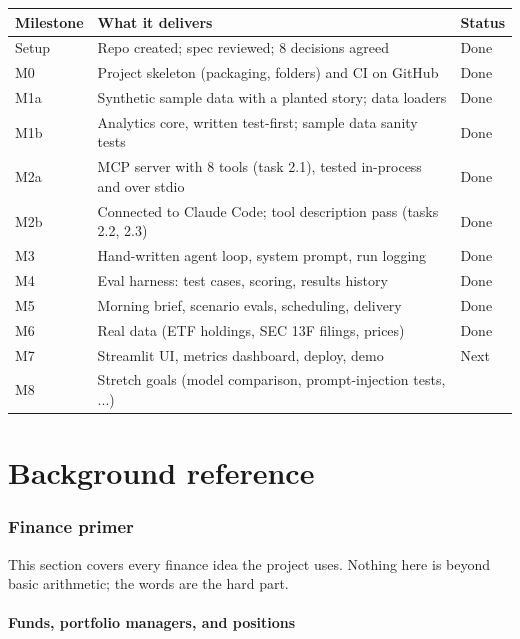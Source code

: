 \documentclass[11pt]{article}
\begin{document}
\begin{center}
\begin{tabularx}{\textwidth}{@{}l X l@{}}
\toprule
\textbf{Milestone} & \textbf{What it delivers} & \textbf{Status} \\
\midrule
Setup & Repo created; spec reviewed; 8 decisions agreed & Done \\
M0  & Project skeleton (packaging, folders) and CI on GitHub & Done \\
M1a & Synthetic sample data with a planted story; data loaders & Done \\
M1b & Analytics core, written test-first; sample data sanity tests & Done \\
M2a & MCP server with 8 tools (task 2.1), tested in-process and over stdio & Done \\
M2b & Connected to Claude Code; tool description pass (tasks 2.2, 2.3) & Done \\
M3  & Hand-written agent loop, system prompt, run logging & Done \\
M4  & Eval harness: test cases, scoring, results history & Done \\
M5  & Morning brief, scenario evals, scheduling, delivery & Done \\
M6  & Real data (ETF holdings, SEC 13F filings, prices) & Done \\
M7  & Streamlit UI, metrics dashboard, deploy, demo & Next \\
M8  & Stretch goals (model comparison, prompt-injection tests, ...) & \\
\bottomrule
\end{tabularx}
\end{center}

\part{Background reference}

\section{Finance primer}

This section covers every finance idea the project uses. Nothing here is beyond basic
arithmetic; the words are the hard part.

\subsection{Funds, portfolio managers, and positions}
\end{document}
